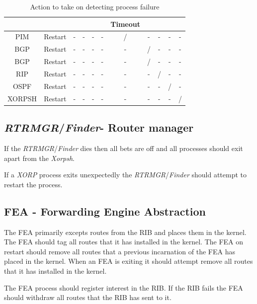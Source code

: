 \documentclass[11pt]{article}
\makeatletter
\newcommand{\xorp} {{\em XORP}\@\xspace}
\newcommand{\finder} {{\em Finder}\@\xspace}
\newcommand{\xorpsh} {{\em Xorpsh}\@\xspace}
\newcommand{\rtrmgr} {{\em RTRMGR}\@\xspace}
\makeatother
\begin{document}
\begin{table}[ht]
\begin{center}
\begin{tabular}{|c|c|c|c|c|c|c|c|c|c|c|}
              &                &          &      &      &      & Timeout &      &      &      &        \\\hline
PIM           &  Restart       & -        & -    & -    & -    & /       & -    & -    & -    & -      \\\hline
BGP           &  Restart       & -        & -    & -    & -    & -       & /    & -    & -    & -      \\\hline
BGP           &  Restart       & -        & -    & -    & -    & -       & /    & -    & -    & -      \\\hline
RIP           &  Restart       & -        & -    & -    & -    & -       & -    & /    & -    & -      \\\hline
OSPF          &  Restart       & -        & -    & -    & -    & -       & -    & -    & /    & -      \\\hline
XORPSH        &  Restart       & -        & -    & -    & -    & -       & -    & -    & -    & /      \\\hline
\end{tabular}
\end{center}
\caption{\label{failure_table}Action to take on detecting process failure}
\end{table}

\subsection{\rtrmgr/\finder - Router manager}

If the \rtrmgr/\finder dies then all bets are off and all processes
should exit apart from the \xorpsh.

If a \xorp process exits unexpectedly the \rtrmgr/\finder should
attempt to restart the process.

\subsection{FEA - Forwarding Engine Abstraction}

The FEA primarily excepts routes from the RIB and places them in the
kernel. The FEA should tag all routes that it has installed in the
kernel. The FEA on restart should remove all routes that a previous
incarnation of the FEA has placed in the kernel. When an FEA is
exiting it should attempt remove all routes that it has installed in
the kernel.

The FEA process should register interest in the RIB. If the RIB fails
the FEA should withdraw all routes that the RIB has sent to it.
\end{document}
